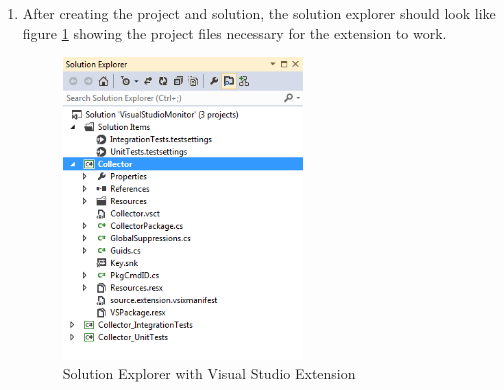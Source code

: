  \begin{Answer}

\begin{enumerate}
\item
After creating the project and solution, the solution explorer should look like figure \ref{fig:SolutionExplorer} showing the project files necessary for the extension to work.
\begin{figure}
	\centering
	\includegraphics[width=2.5in]{Graphics/SolutionExplorer.png}
	\caption{Solution Explorer with Visual Studio Extension}
	\label{fig:SolutionExplorer}
\end{figure}
\end{enumerate}
\end{Answer}

